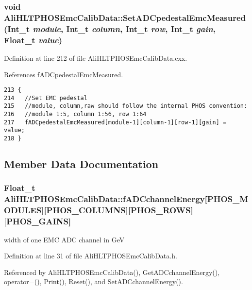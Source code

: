 \subsubsection{\setlength{\rightskip}{0pt plus 5cm}void Ali\-HLTPHOSEmc\-Calib\-Data::Set\-ADCpedestal\-Emc\-Measured (Int\_\-t {\em module}, Int\_\-t {\em column}, Int\_\-t {\em row}, Int\_\-t {\em gain}, Float\_\-t {\em value})}\label{classAliHLTPHOSEmcCalibData_AliHLTPHOSEmcCalibDataa10}




Definition at line 212 of file Ali\-HLTPHOSEmc\-Calib\-Data.cxx.

References f\-ADCpedestal\-Emc\-Measured.

\footnotesize\begin{verbatim}213 {
214   //Set EMC pedestal
215   //module, column,raw should follow the internal PHOS convention:
216   //module 1:5, column 1:56, row 1:64
217   fADCpedestalEmcMeasured[module-1][column-1][row-1][gain] = value;
218 }
\end{verbatim}\normalsize 




\subsection{Member Data Documentation}
\subsubsection{\setlength{\rightskip}{0pt plus 5cm}Float\_\-t {\bf Ali\-HLTPHOSEmc\-Calib\-Data::f\-ADCchannel\-Energy}[PHOS\_\-MODULES][PHOS\_\-COLUMNS][PHOS\_\-ROWS][PHOS\_\-GAINS]\hspace{0.3cm}{\tt  [protected]}}\label{classAliHLTPHOSEmcCalibData_AliHLTPHOSEmcCalibDatap0}


width of one EMC ADC channel in Ge\-V 

Definition at line 31 of file Ali\-HLTPHOSEmc\-Calib\-Data.h.

Referenced by Ali\-HLTPHOSEmc\-Calib\-Data(), Get\-ADCchannel\-Energy(), operator=(), Print(), Reset(), and Set\-ADCchannel\-Energy().
